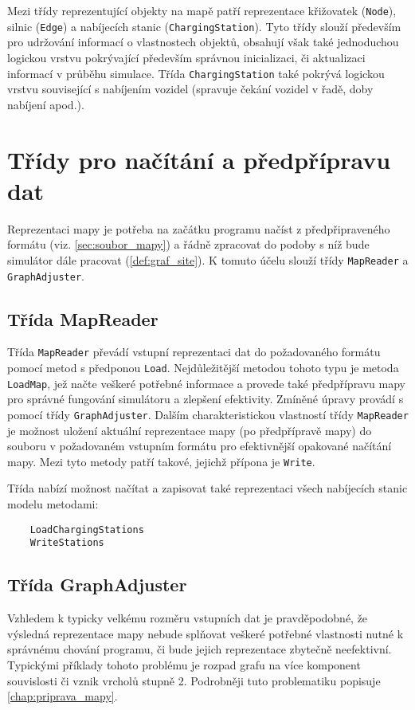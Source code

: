 Mezi třídy reprezentující objekty na mapě patří reprezentace křižovatek (\texttt{Node}),
silnic (\texttt{Edge}) a nabíjecích stanic (\texttt{ChargingStation}). 
Tyto třídy slouží především pro udržování informací o vlastnostech objektů,
obsahují však také jednoduchou logickou vrstvu pokrývající především správnou 
inicializaci, či aktualizaci informací v průběhu simulace. Třída \texttt{ChargingStation}
také pokrývá logickou vrstvu související s nabíjením vozidel (spravuje čekání 
vozidel v řadě, doby nabíjení apod.).


\section{Třídy pro načítání a předpřípravu dat}

Reprezentaci mapy je potřeba na začátku programu načíst z předpřipraveného 
formátu (viz. \cref{sec:soubor_mapy}) a řádně zpracovat do podoby s níž bude
simulátor dále pracovat (\cref{def:graf_site}). K tomuto
účelu slouží třídy \texttt{MapReader} a \texttt{GraphAdjuster}.

\subsection{Třída MapReader}
Třída \texttt{MapReader} převádí vstupní reprezentaci dat do požadovaného formátu
pomocí metod s předponou \texttt{Load}. Nejdůležitější metodou tohoto typu je metoda
\texttt{LoadMap}, jež načte veškeré potřebné informace a provede také předpřípravu 
mapy pro správné fungování simulátoru a zlepšení efektivity. Zmíněné úpravy
provádí s pomocí třídy \texttt{GraphAdjuster}. Dalším charakteristickou vlastností třídy
\texttt{MapReader} je možnost uložení aktuální reprezentace mapy (po předpřípravě mapy)
do souboru v požadovaném vstupním formátu pro efektivnější opakované 
načítání mapy. Mezi tyto metody patří takové, jejichž přípona je \texttt{Write}.

Třída nabízí možnost načítat a zapisovat také reprezentaci všech nabíjecích
stanic modelu metodami:

\begin{verbatim}
    LoadChargingStations
    WriteStations
\end{verbatim}

\subsection{Třída GraphAdjuster}
Vzhledem k typicky velkému rozměru vstupních dat je pravděpodobné, že výsledná
reprezentace mapy nebude splňovat veškeré potřebné vlastnosti nutné k správnému
chování programu, či bude jejich reprezentace zbytečně neefektivní. 
Typickými příklady tohoto problému je rozpad grafu na více komponent souvislosti
či vznik vrcholů stupně 2. Podrobněji tuto problematiku popisuje \cref{chap:priprava_mapy}. 

